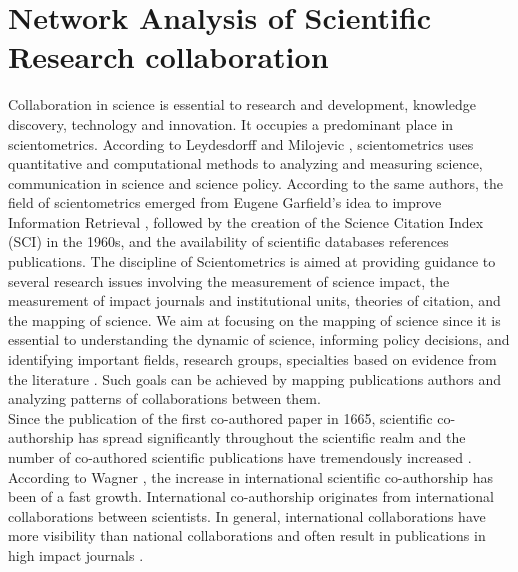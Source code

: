 \section{Network Analysis of Scientific Research collaboration}
Collaboration in science is essential to research and development, knowledge discovery, technology and innovation. It occupies a predominant place in scientometrics. According to Leydesdorff and Milojevic \cite{leydesdorff_scientometrics_2012}, scientometrics uses quantitative and computational methods to analyzing and measuring science, communication in science and science policy. According to the same authors, the field of scientometrics emerged from Eugene Garfield’s idea to improve Information Retrieval \cite{eugene_citation_1979}, followed by the creation of the Science Citation Index (SCI) in the 1960s, and the availability of scientific databases references publications. The discipline of Scientometrics is aimed at providing guidance to several research issues involving the measurement of science impact, the measurement of impact journals and institutional units, theories of citation, and the mapping of science. We aim at focusing on the mapping of science since it is essential to understanding the dynamic of science, informing policy decisions, and identifying important fields, research groups, specialties based on evidence from the literature \cite{leydesdorff_scientometrics_2012}. Such goals can be achieved by mapping publications authors and analyzing patterns of collaborations between them.\\
Since the publication of the first co-authored paper in 1665, scientific co-authorship has spread significantly throughout the scientific realm and the number of co-authored scientific publications have tremendously increased \cite{luukkonen_understanding_1992}. According to Wagner \cite{wagner_six_2005}, the increase in international scientific co-authorship has been of a fast growth. International co-authorship originates from international collaborations between scientists. In general, international collaborations have more visibility than national collaborations and often result in publications in high impact journals \cite{glanzel_analysing_2004}.\\
